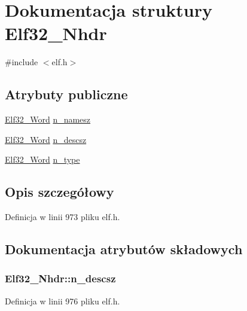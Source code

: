 \hypertarget{struct_elf32___nhdr}{\section{Dokumentacja struktury Elf32\-\_\-\-Nhdr}
\label{struct_elf32___nhdr}
}


{\ttfamily \#include $<$elf.\-h$>$}

\subsection*{Atrybuty publiczne}
\begin{DoxyCompactItemize}
\item 
\hyperlink{elf_8h_af5924ece606c732e86f8263a19408e45}{Elf32\-\_\-\-Word} \hyperlink{struct_elf32___nhdr_a8e6389f882a5c695518a833b4c1bd9c6}{n\-\_\-namesz}
\item 
\hyperlink{elf_8h_af5924ece606c732e86f8263a19408e45}{Elf32\-\_\-\-Word} \hyperlink{struct_elf32___nhdr_ad83450c86fb3e14d1096a141ea705f33}{n\-\_\-descsz}
\item 
\hyperlink{elf_8h_af5924ece606c732e86f8263a19408e45}{Elf32\-\_\-\-Word} \hyperlink{struct_elf32___nhdr_afdab20b47522cb964500a200ceb92462}{n\-\_\-type}
\end{DoxyCompactItemize}


\subsection{Opis szczegółowy}


Definicja w linii 973 pliku elf.\-h.



\subsection{Dokumentacja atrybutów składowych}
\hypertarget{struct_elf32___nhdr_ad83450c86fb3e14d1096a141ea705f33}{
\subsubsection[{n\-\_\-descsz}]{ Elf32\-\_\-\-Nhdr\-::n\-\_\-descsz}}\label{struct_elf32___nhdr_ad83450c86fb3e14d1096a141ea705f33}


Definicja w linii 976 pliku elf.\-h.

